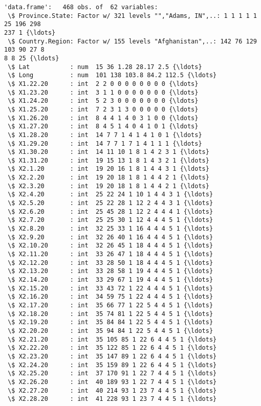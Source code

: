 \documentclass[11pt]{article}
\begin{document}
    \begin{Verbatim}[commandchars=\\\{\}]
'data.frame':   468 obs. of  62 variables:
 \$ Province.State: Factor w/ 321 levels "","Adams, IN",..: 1 1 1 1 1 25 196 298
237 1 {\ldots}
 \$ Country.Region: Factor w/ 155 levels "Afghanistan",..: 142 76 129 103 90 27 8
8 8 25 {\ldots}
 \$ Lat           : num  15 36 1.28 28.17 2.5 {\ldots}
 \$ Long          : num  101 138 103.8 84.2 112.5 {\ldots}
 \$ X1.22.20      : int  2 2 0 0 0 0 0 0 0 0 {\ldots}
 \$ X1.23.20      : int  3 1 1 0 0 0 0 0 0 0 {\ldots}
 \$ X1.24.20      : int  5 2 3 0 0 0 0 0 0 0 {\ldots}
 \$ X1.25.20      : int  7 2 3 1 3 0 0 0 0 0 {\ldots}
 \$ X1.26.20      : int  8 4 4 1 4 0 3 1 0 0 {\ldots}
 \$ X1.27.20      : int  8 4 5 1 4 0 4 1 0 1 {\ldots}
 \$ X1.28.20      : int  14 7 7 1 4 1 4 1 0 1 {\ldots}
 \$ X1.29.20      : int  14 7 7 1 7 1 4 1 1 1 {\ldots}
 \$ X1.30.20      : int  14 11 10 1 8 1 4 2 3 1 {\ldots}
 \$ X1.31.20      : int  19 15 13 1 8 1 4 3 2 1 {\ldots}
 \$ X2.1.20       : int  19 20 16 1 8 1 4 4 3 1 {\ldots}
 \$ X2.2.20       : int  19 20 18 1 8 1 4 4 2 1 {\ldots}
 \$ X2.3.20       : int  19 20 18 1 8 1 4 4 2 1 {\ldots}
 \$ X2.4.20       : int  25 22 24 1 10 1 4 4 3 1 {\ldots}
 \$ X2.5.20       : int  25 22 28 1 12 2 4 4 3 1 {\ldots}
 \$ X2.6.20       : int  25 45 28 1 12 2 4 4 4 1 {\ldots}
 \$ X2.7.20       : int  25 25 30 1 12 4 4 4 5 1 {\ldots}
 \$ X2.8.20       : int  32 25 33 1 16 4 4 4 5 1 {\ldots}
 \$ X2.9.20       : int  32 26 40 1 16 4 4 4 5 1 {\ldots}
 \$ X2.10.20      : int  32 26 45 1 18 4 4 4 5 1 {\ldots}
 \$ X2.11.20      : int  33 26 47 1 18 4 4 4 5 1 {\ldots}
 \$ X2.12.20      : int  33 28 50 1 18 4 4 4 5 1 {\ldots}
 \$ X2.13.20      : int  33 28 58 1 19 4 4 4 5 1 {\ldots}
 \$ X2.14.20      : int  33 29 67 1 19 4 4 4 5 1 {\ldots}
 \$ X2.15.20      : int  33 43 72 1 22 4 4 4 5 1 {\ldots}
 \$ X2.16.20      : int  34 59 75 1 22 4 4 4 5 1 {\ldots}
 \$ X2.17.20      : int  35 66 77 1 22 5 4 4 5 1 {\ldots}
 \$ X2.18.20      : int  35 74 81 1 22 5 4 4 5 1 {\ldots}
 \$ X2.19.20      : int  35 84 84 1 22 5 4 4 5 1 {\ldots}
 \$ X2.20.20      : int  35 94 84 1 22 5 4 4 5 1 {\ldots}
 \$ X2.21.20      : int  35 105 85 1 22 6 4 4 5 1 {\ldots}
 \$ X2.22.20      : int  35 122 85 1 22 6 4 4 5 1 {\ldots}
 \$ X2.23.20      : int  35 147 89 1 22 6 4 4 5 1 {\ldots}
 \$ X2.24.20      : int  35 159 89 1 22 6 4 4 5 1 {\ldots}
 \$ X2.25.20      : int  37 170 91 1 22 7 4 4 5 1 {\ldots}
 \$ X2.26.20      : int  40 189 93 1 22 7 4 4 5 1 {\ldots}
 \$ X2.27.20      : int  40 214 93 1 23 7 4 4 5 1 {\ldots}
 \$ X2.28.20      : int  41 228 93 1 23 7 4 4 5 1 {\ldots}

\end{Verbatim}
\end{document}
